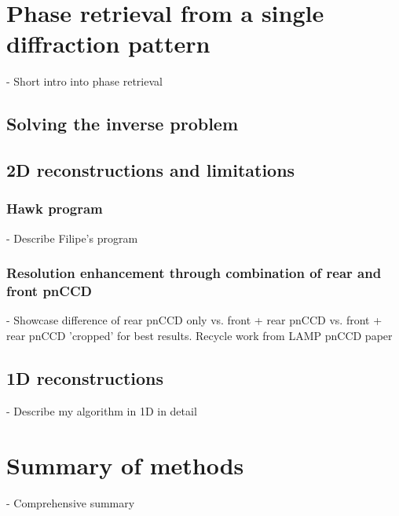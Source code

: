 \section{Phase retrieval from a single diffraction pattern}
- Short intro into phase retrieval
\subsection{Solving the inverse problem}
\subsection{2D reconstructions and limitations}
\subsubsection{Hawk program}
- Describe Filipe's program
\subsubsection{Resolution enhancement through combination of rear and front pnCCD}
- Showcase difference of rear pnCCD only vs. front + rear pnCCD vs. front + rear pnCCD 'cropped' for best results. Recycle work from LAMP pnCCD paper
\subsection{1D reconstructions}
- Describe my algorithm in 1D in detail
\section{Summary of methods}
- Comprehensive summary 